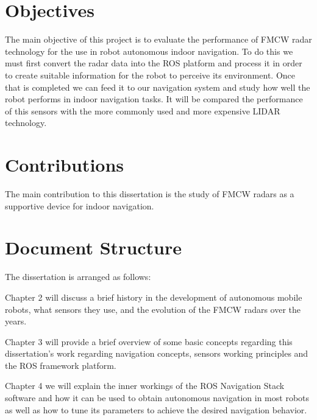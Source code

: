 \section{Objectives}
The main objective of this project is to evaluate the performance of \ac{FMCW} radar technology for the use in robot autonomous indoor navigation. To do this we must first convert the radar data into the \ac{ROS} platform and process it in order to create suitable information for the robot to perceive its environment. Once that is completed we can feed it to our navigation system and study how well the robot performs in indoor navigation tasks.
It will be compared the performance of this sensors with the more commonly used and more expensive \ac{LIDAR} technology.

\section{Contributions}
The main contribution to this dissertation is the study of \ac{FMCW} radars as a supportive device for indoor navigation.
\section{Document Structure}
The dissertation is arranged as follows:

Chapter 2 will discuss a brief history in the development of autonomous mobile robots, what sensors they use, and the evolution of the \ac{FMCW} radars over the years.

Chapter 3 will provide a brief overview of some basic concepts regarding this dissertation's work regarding navigation concepts, sensors working principles and the ROS framework platform.

Chapter 4 we will explain the inner workings of the ROS Navigation Stack software and how it can be used to obtain autonomous navigation in most robots as well as how to tune its parameters to achieve the desired navigation behavior.





